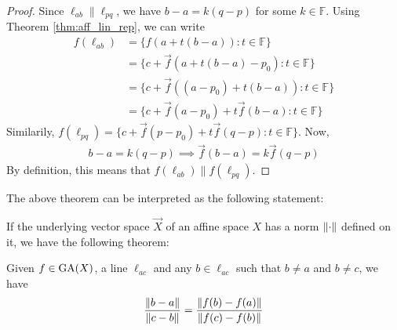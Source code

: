 \begin{proof}
    Since $\ell_{ab}\parallel\ell_{pq}$, we have $b-a=k(q-p)$ for some
    $k\in\mathbb{F}$. Using Theorem \ref{thm:aff_lin_rep}, we can write
    \begin{align*}
        f(\ell_{ab}) &= \{f(a + t(b-a)): t\in\mathbb{F}\} \\
                     &= \{c + \vec{f}(a + t(b-a) - p_0): t\in\mathbb{F}\} \\
                     &= \{c + \vec{f}((a-p_0)+t(b-a)): t\in\mathbb{F}\} \\
                     &= \{c + \vec{f}(a-p_0) + t\vec{f}(b-a): t\in\mathbb{F}\}
    \end{align*}
    Similarily,
    $f(\ell_{pq}) = \{c + \vec{f}(p - p_0) +t\vec{f}(q-p): t\in\mathbb{F}\}$.
    Now,
    \begin{align*}
        b - a = k(q - p) \implies \vec{f}(b-a) = k\vec{f}(q - p)
    \end{align*}
    By definition, this means that $f(\ell_{ab}) \parallel f(\ell_{pq})$.

\end{proof}

The above theorem can be interpreted as the following statement:
\vspace{1ex}

\begin{center}
\end{center}
\vspace{1ex}

\noindent
If the underlying vector space $\vec{X}$ of an affine space $X$ has a norm 
$\left\lVert{\cdot}\right\rVert$ defined on it, we have the following theorem:

\begin{theorem}
    Given $f\in\operatorname{GA}(X)$, a line $\ell_{ac}$ and any $b\in\ell_{ac}$ such that
    $b \neq a$ and $b \neq c$, we have
    \[ \frac{\left\lVert{b-a}\right\rVert}{\left\lVert{c-b}\right\rVert}=\frac{\left\lVert{f(b)-f(a)}\right\rVert}{\left\lVert{f(c)-f(b)}\right\rVert} \]
\end{theorem}

